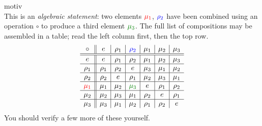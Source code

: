 \begin{example}{}{motiv}
\[	\]
	This is an \emph{algebraic statement}: two elements $\textcolor{red}{\mu_1}$, $\textcolor{blue}{\rho_2}$ have been combined using an operation $\circ$ to produce a third element $\textcolor{Green}{\mu_3}$. The full list of compositions may be assembled in a table; read the left column first, then the top row.\label{intro:table}
	\[
		\begin{array}{c||c|c|c|c|c|c}
			\circ & e & \rho_1 & \textcolor{blue}{\rho_2} & \mu_1 & \mu_2 & \mu_3\\
			 \hline\hline
			e & e & \rho_1 & \rho_2 & \mu_1 & \mu_2 & \mu_3\\
			\hline
			\rho_1 & \rho_1 & \rho_2 & e & \mu_3 & \mu_1 & \mu_2\\
			\hline
			\rho_2 & \rho_2 & e & \rho_1 & \mu_2 & \mu_3 & \mu_1\\
			\hline
			\textcolor{red}{\mu_1} & \mu_1 & \mu_2 & \textcolor{Green}{\mu_3} & e & \rho_1 & \rho_2\\
			\hline
			\mu_2 & \mu_2 & \mu_3 & \mu_1 & \rho_2 & e & \rho_1\\
			\hline
			\mu_3 & \mu_3 & \mu_1 & \mu_2 & \rho_1 & \rho_2 & e
		\end{array}
	\]
	You should verify a few more of these yourself.
\end{example}

\vspace{-12pt}


\clearpage
\goodbreak


